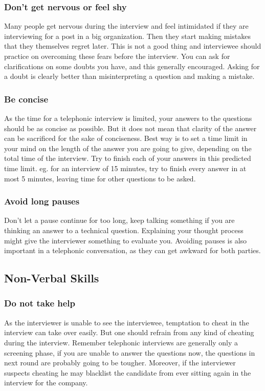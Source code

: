 \documentclass[a4paper,12pt]{report}
\begin{document}
\subsubsection{Don't get nervous or feel shy}
Many people get nervous during the interview and feel intimidated if they are interviewing for a post in
a big organization. Then they start making mistakes that they themselves regret later. This is not a good 
thing and interviewee should practice on overcoming these fears before the interview. You can ask for clarifications
on some doubts you have, and this generally encouraged. Asking for a doubt is clearly better than misinterpreting
a question and making a mistake.
\subsubsection{Be concise}
As the time for a telephonic interview is limited, your answers to the questions should be as concise as possible.
But it does not mean that clarity of the answer can be sacrificed for the sake of conciseness. Best way is to
set a time limit in your mind on the length of the answer you are going to give, depending on the total time of the interview.
Try to finish each of your answers in this predicted time limit. eg. for an interview of 15 minutes, try to finish
every answer in at most 5 minutes, leaving time for other questions to be asked.
\subsubsection{Avoid long pauses}
Don't let a pause continue for too long, keep talking something if you are thinking an answer to a technical
question. Explaining your thought process might give the interviewer something to evaluate you. Avoiding pauses
is also important in a telephonic conversation, as they can get awkward for both parties.

\subsection{Non-Verbal Skills}
\subsubsection{Do not take help}
As the interviewer is unable to see the interviewee, temptation to cheat in the interview can take over easily.
But one should refrain from any kind of cheating during the interview. Remember telephonic interviews are generally
only a screening phase, if you are unable to answer the questions now, the questions in next round are probably 
going to be tougher. Moreover, if the interviewer suspects cheating he may blacklist the candidate from ever sitting
again in the interview for the company.
\end{document}
